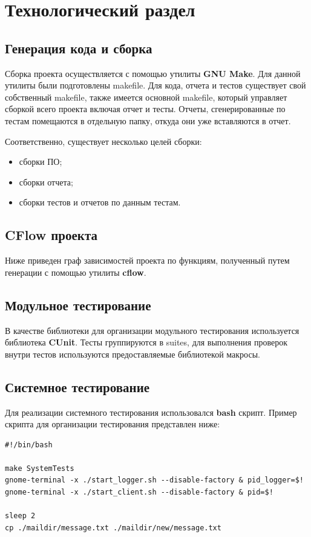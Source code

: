 \documentclass[a4paper,12pt]{article}
\begin{document}
\section{Технологический раздел}
\subsection{Генерация кода и сборка}

Сборка проекта осуществляется с помощью утилиты \textbf{GNU Make}. Для данной утилиты были подготовлены makefile. Для кода, отчета и тестов существует свой собственный makefile, также имеется основной makefile, который управляет сборкой всего проекта включая отчет и тесты.
Отчеты, сгенерированные по тестам помещаются в отдельную папку, откуда они уже вставляются в отчет.

Соответственно, существует несколько целей сборки:
\begin{itemize}
\item сборки ПО;
\item сборки отчета;
\item сборки тестов и отчетов по данным тестам.
\end{itemize}

\subsection{CFlow проекта}
Ниже приведен граф зависимостей проекта по функциям, полученный путем генерации с помощью утилиты \textbf{cflow}.

\subsection{Модульное тестирование}
В качестве библиотеки для организации модульного тестирования используется библиотека \textbf{CUnit}. Тесты группируются в suites, для выполнения проверок внутри тестов используются предоставляемые библиотекой макросы.

\subsection{Системное тестирование}

Для реализации системного тестирования использовался \textbf{bash} скрипт.
Пример скрипта для организации тестирования представлен ниже:
\begin{Verbatim}
#!/bin/bash

make SystemTests
gnome-terminal -x ./start_logger.sh --disable-factory & pid_logger=$!
gnome-terminal -x ./start_client.sh --disable-factory & pid=$!

sleep 2
cp ./maildir/message.txt ./maildir/new/message.txt
\end{Verbatim}
\end{document}
